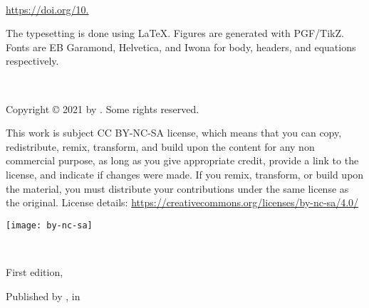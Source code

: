 
{\small\setlength{\parindent}{0em}\setlength{\parskip}{1em}
~

\vfill

\url{https://doi.org/10.}

The typesetting is done using \LaTeX. Figures are generated with PGF/TikZ. Fonts are EB Garamond, Helvetica, and Iwona for body, headers, and equations respectively.

~

Copyright \copyright{} 2021 by \authorname. Some rights reserved.

This work is subject CC BY-NC-SA license, which means that you can copy, redistribute, remix, transform, and build upon the content for any non commercial purpose, as long as you give appropriate credit, provide a link to the license, and indicate if changes were made. If you remix, transform, or build upon the material, you must distribute your contributions under the same license as the original. License details: \url{https://creativecommons.org/licenses/by-nc-sa/4.0/}

\texttt{[image: by-nc-sa]}

~

First edition, \editionyear{}


Published by \publisher{}, in \place{}
}\cleardoublepage
